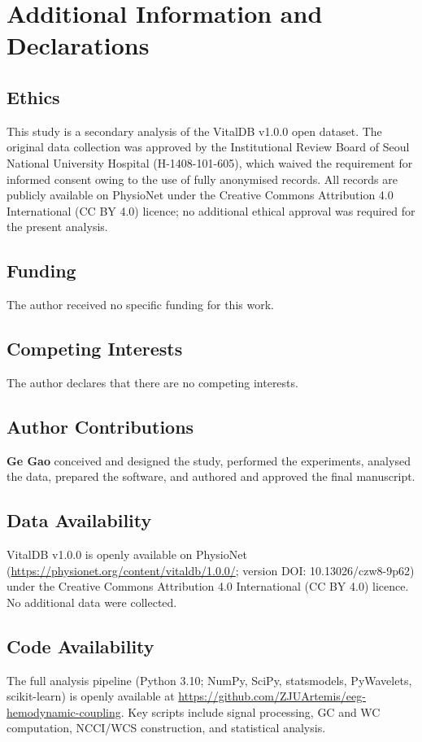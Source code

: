 \documentclass[fleqn,10pt,lineno]{wlpeerj}
\begin{document}
\section{Additional Information and Declarations}

\subsection{Ethics}
This study is a secondary analysis of the VitalDB v1.0.0 open dataset. The original data
collection was approved by the Institutional Review Board of Seoul National University Hospital
(H-1408-101-605), which waived the requirement for informed consent owing to the use of fully
anonymised records. All records are publicly available on PhysioNet under the Creative Commons
Attribution 4.0 International (CC BY 4.0) licence; no additional ethical approval was required
for the present analysis.

\subsection{Funding}
The author received no specific funding for this work.

\subsection{Competing Interests}
The author declares that there are no competing interests.

\subsection{Author Contributions}
\textbf{Ge Gao} conceived and designed the study, performed the experiments, analysed the data,
prepared the software, and authored and approved the final manuscript.

\subsection{Data Availability}
VitalDB v1.0.0 is openly available on PhysioNet
(\url{https://physionet.org/content/vitaldb/1.0.0/}; version DOI: 10.13026/czw8-9p62) under the
Creative Commons Attribution 4.0 International (CC BY 4.0) licence. No additional data were
collected.

\subsection{Code Availability}
The full analysis pipeline (Python 3.10; NumPy, SciPy, statsmodels, PyWavelets, scikit-learn)
is openly available at \url{https://github.com/ZJUArtemis/eeg-hemodynamic-coupling}. Key
scripts include signal processing, GC and WC computation, NCCI/WCS construction, and
statistical analysis.
\end{document}
